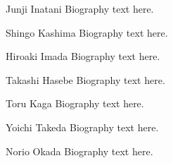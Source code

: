\documentclass[journal]{IEEEtran}
\begin{document}
%
\begin{IEEEbiographynophoto}{Junji Inatani}
Biography text here.
\end{IEEEbiographynophoto}
%
\begin{IEEEbiographynophoto}{Shingo Kashima}
Biography text here.
\end{IEEEbiographynophoto}
%
\begin{IEEEbiographynophoto}{Hiroaki Imada}
Biography text here.
\end{IEEEbiographynophoto}
%
\begin{IEEEbiographynophoto}{Takashi Hasebe}
Biography text here.
\end{IEEEbiographynophoto}
\begin{IEEEbiographynophoto}{Toru Kaga}
Biography text here.
\end{IEEEbiographynophoto}
%
\begin{IEEEbiographynophoto}{Yoichi Takeda}
Biography text here.
\end{IEEEbiographynophoto}
%
%
\begin{IEEEbiographynophoto}{Norio Okada}
Biography text here.
\end{IEEEbiographynophoto}
%
%
%
\end{document}
